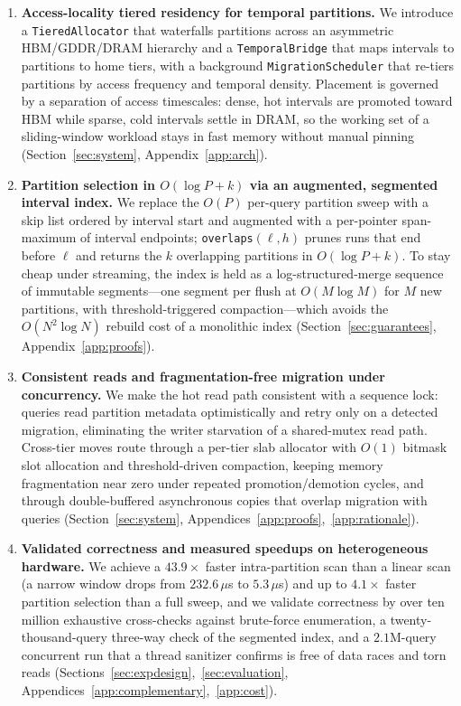 \documentclass[10pt]{article}
\theoremstyle{definition}
\begin{document}
\begin{enumerate}
  \item \textbf{Access-locality tiered residency for temporal partitions.}
  We introduce a \texttt{TieredAllocator} that waterfalls partitions across an
  asymmetric HBM/GDDR/DRAM hierarchy and a \texttt{TemporalBridge} that maps
  intervals to partitions to home tiers, with a background
  \texttt{MigrationScheduler} that re-tiers partitions by access frequency and
  temporal density. Placement is governed by a separation of access timescales:
  dense, hot intervals are promoted toward HBM while sparse, cold intervals settle
  in DRAM, so the working set of a sliding-window workload stays in fast memory
  without manual pinning (Section~\ref{sec:system}, Appendix~\ref{app:arch}).

  \item \textbf{Partition selection in $O(\log P + k)$ via an augmented,
  segmented interval index.} We replace the $O(P)$ per-query partition sweep with
  a skip list ordered by interval start and augmented with a per-pointer
  span-maximum of interval endpoints; \texttt{overlaps}$(\ell,h)$ prunes runs that
  end before $\ell$ and returns the $k$ overlapping partitions in $O(\log P + k)$.
  To stay cheap under streaming, the index is held as a log-structured-merge
  sequence of immutable segments---one segment per flush at $O(M\log M)$ for $M$
  new partitions, with threshold-triggered compaction---which avoids the
  $O(N^2\log N)$ rebuild cost of a monolithic index
  (Section~\ref{sec:guarantees}, Appendix~\ref{app:proofs}).

  \item \textbf{Consistent reads and fragmentation-free migration under
  concurrency.} We make the hot read path consistent with a sequence lock: queries
  read partition metadata optimistically and retry only on a detected migration,
  eliminating the writer starvation of a shared-mutex read path. Cross-tier moves
  route through a per-tier slab allocator with $O(1)$ bitmask slot allocation and
  threshold-driven compaction, keeping memory fragmentation near zero under
  repeated promotion/demotion cycles, and through double-buffered asynchronous
  copies that overlap migration with queries
  (Section~\ref{sec:system}, Appendices~\ref{app:proofs},~\ref{app:rationale}).

  \item \textbf{Validated correctness and measured speedups on heterogeneous
  hardware.} We achieve a $43.9\times$ faster intra-partition scan than a linear
  scan (a narrow window drops from $232.6\,\mu$s to $5.3\,\mu$s) and up to
  $4.1\times$ faster partition selection than a full sweep, and we validate
  correctness by over ten million exhaustive cross-checks against brute-force
  enumeration, a twenty-thousand-query three-way check of the segmented index, and
  a $2.1$M-query concurrent run that a thread sanitizer confirms is free of data
  races and torn reads (Sections~\ref{sec:expdesign},~\ref{sec:evaluation},
  Appendices~\ref{app:complementary},~\ref{app:cost}).
\end{enumerate}
\end{document}
